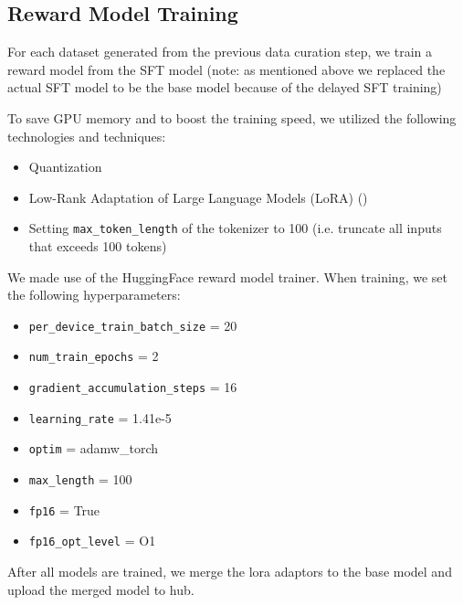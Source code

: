 \subsection{Reward Model Training}
For each dataset generated from the previous data curation step, we train a reward model from the SFT model (note: as mentioned above we replaced the actual SFT model to be the base model because of the delayed SFT training)

To save GPU memory and to boost the training speed, we utilized the following technologies and techniques:
\begin{itemize}
    \item Quantization
    \item Low-Rank Adaptation of Large Language Models (LoRA) (\cite{lora})
    \item Setting \texttt{max\_token\_length} of the tokenizer to 100 (i.e. truncate all inputs that exceeds 100 tokens)
\end{itemize}

We made use of the HuggingFace reward model trainer. When training, we set the following hyperparameters:
\begin{itemize}
    \item \texttt{per\_device\_train\_batch\_size} = 20
    \item \texttt{num\_train\_epochs} = 2
    \item \texttt{gradient\_accumulation\_steps} = 16
    \item \texttt{learning\_rate} = 1.41e-5
    \item \texttt{optim} = adamw\_torch
    \item \texttt{max\_length} = 100
    \item \texttt{fp16} = True
    \item \texttt{fp16\_opt\_level} = O1
\end{itemize}

After all models are trained, we merge the lora adaptors to the base model and upload the merged model to hub.

